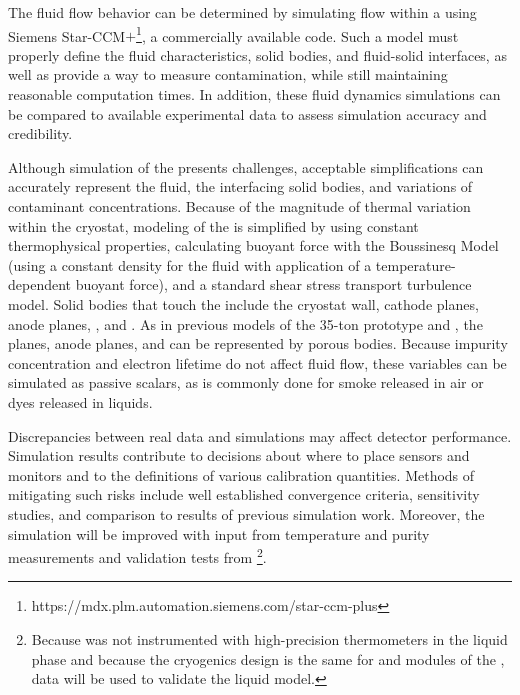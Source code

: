 The fluid flow behavior can be determined by simulating  flow within a  %
using Siemens Star-CCM$+$\footnote{https://mdx.plm.automation.siemens.com/star-ccm-plus}, a commercially available  code.  Such a model must properly define the fluid characteristics, solid bodies, and fluid-solid interfaces, as well as provide a way to measure contamination, while still maintaining reasonable computation times. In addition, these fluid dynamics simulations can be compared to available experimental data to assess simulation accuracy and credibility.



Although simulation of the  presents challenges, %
acceptable simplifications can %
accurately represent the fluid, the interfacing solid bodies, and variations of contaminant concentrations. Because of the magnitude of thermal variation within the cryostat, modeling of the  is simplified by using constant thermophysical properties, calculating buoyant force with the Boussinesq Model (using a constant density for the fluid with application of a temperature-dependent buoyant force), and a standard shear stress transport turbulence model. Solid bodies that touch the  include the cryostat wall, cathode planes, anode planes, , and . As in previous  models of the  35-ton prototype and 
\cite{bib:docdb5915}, the  planes, anode planes, and  can be represented by porous bodies. Because impurity concentration and electron lifetime do not affect fluid flow, these variables can be simulated as passive scalars, as is commonly done for smoke released \cite{cfd-1} 
in air or dyes released in liquids.


Discrepancies between real data and simulations may affect detector performance. %
Simulation results contribute to decisions about where to place sensors and monitors and to %
the definitions of various calibration quantities. Methods of mitigating such risks include well established convergence criteria, sensitivity studies, and comparison to results of previous  simulation work. Moreover, the simulation will be improved with input from \lar temperature and purity measurements and validation tests from \footnote{Because  was not instrumented with high-precision thermometers in the liquid phase and because the cryogenics design is the same for  and  modules of the  ,  data will be used to validate the liquid  model.}. 

